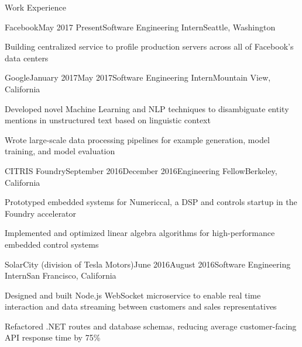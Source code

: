 \documentclass{resume} %
\begin{document}
\begin{rSection}{Work Experience}
\begin{rSubsection}{Facebook}{May 2017 \textminus Present}{Software Engineering Intern}{Seattle, Washington}
\item[] Building centralized service to profile production servers across all of Facebook's data centers
\end{rSubsection}
\begin{rSubsection}{Google}{January 2017\textminus May 2017}{Software Engineering Intern}{Mountain View, California}
\item[] Developed novel Machine Learning and NLP techniques to disambiguate entity mentions in unstructured text based on linguistic context
\item[] Wrote large-scale data processing pipelines for example generation, model training, and model evaluation
\end{rSubsection}
\begin{rSubsection}{CITRIS Foundry}{September 2016\textminus December 2016}{Engineering Fellow}{Berkeley, California}
\item[] Prototyped embedded systems for Numericcal, a DSP and controls startup in the Foundry accelerator
\item[] Implemented and optimized linear algebra algorithms for high-performance embedded control systems
\end{rSubsection}
\begin{rSubsection}{SolarCity (division of Tesla Motors)}{June 2016\textminus August 2016}{Software Engineering Intern}{San Francisco, California}
\item[] Designed and built Node.js WebSocket microservice to enable real time interaction and data streaming between customers and sales representatives
\item[] Refactored .NET routes and database schemas, reducing average customer-facing API response time by 75\%
\end{rSubsection}
\end{rSection}
\end{document}

